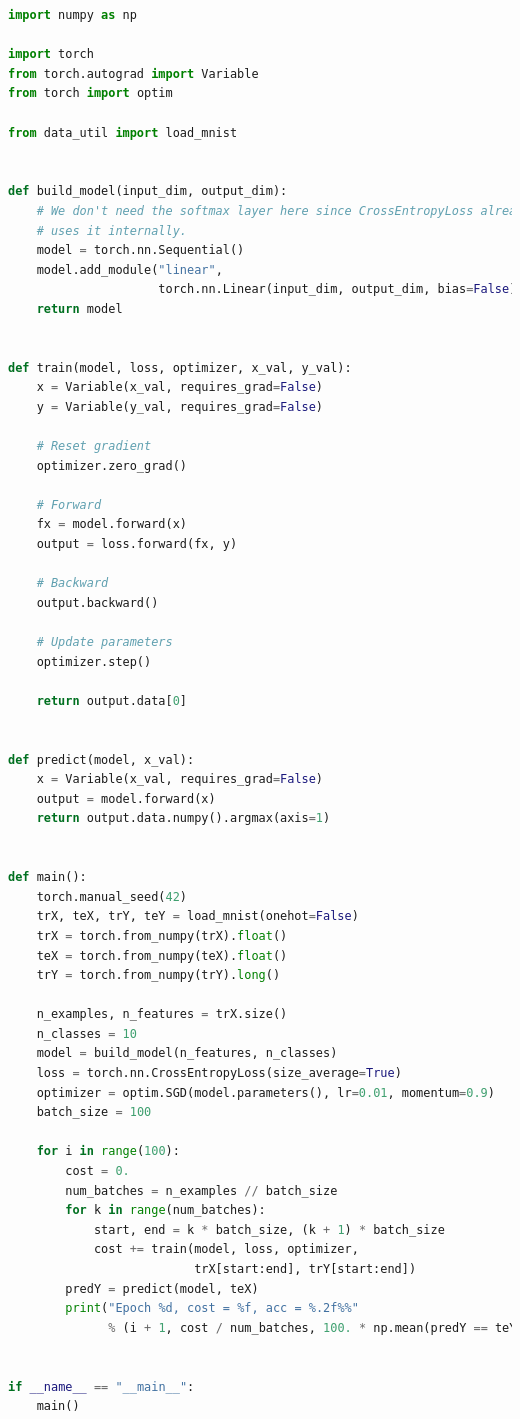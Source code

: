 \documentclass{article}
\begin{document}
\begin{lstlisting}[language=Python, caption=Solution for Exercise 5.2]
import numpy as np

import torch
from torch.autograd import Variable
from torch import optim

from data_util import load_mnist


def build_model(input_dim, output_dim):
    # We don't need the softmax layer here since CrossEntropyLoss already
    # uses it internally.
    model = torch.nn.Sequential()
    model.add_module("linear",
                     torch.nn.Linear(input_dim, output_dim, bias=False))
    return model


def train(model, loss, optimizer, x_val, y_val):
    x = Variable(x_val, requires_grad=False)
    y = Variable(y_val, requires_grad=False)

    # Reset gradient
    optimizer.zero_grad()

    # Forward
    fx = model.forward(x)
    output = loss.forward(fx, y)

    # Backward
    output.backward()

    # Update parameters
    optimizer.step()

    return output.data[0]


def predict(model, x_val):
    x = Variable(x_val, requires_grad=False)
    output = model.forward(x)
    return output.data.numpy().argmax(axis=1)


def main():
    torch.manual_seed(42)
    trX, teX, trY, teY = load_mnist(onehot=False)
    trX = torch.from_numpy(trX).float()
    teX = torch.from_numpy(teX).float()
    trY = torch.from_numpy(trY).long()

    n_examples, n_features = trX.size()
    n_classes = 10
    model = build_model(n_features, n_classes)
    loss = torch.nn.CrossEntropyLoss(size_average=True)
    optimizer = optim.SGD(model.parameters(), lr=0.01, momentum=0.9)
    batch_size = 100

    for i in range(100):
        cost = 0.
        num_batches = n_examples // batch_size
        for k in range(num_batches):
            start, end = k * batch_size, (k + 1) * batch_size
            cost += train(model, loss, optimizer,
                          trX[start:end], trY[start:end])
        predY = predict(model, teX)
        print("Epoch %d, cost = %f, acc = %.2f%%"
              % (i + 1, cost / num_batches, 100. * np.mean(predY == teY)))


if __name__ == "__main__":
    main()
\end{lstlisting}
\end{document}
